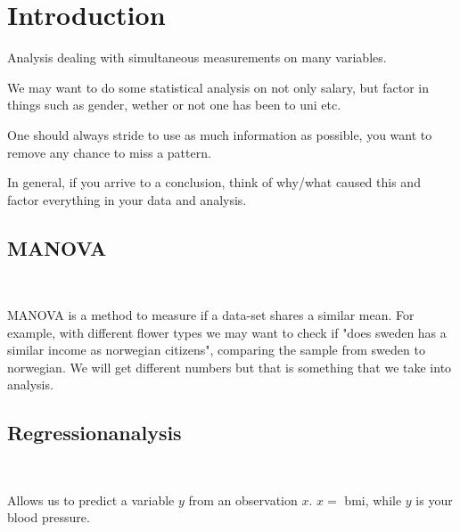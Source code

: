 \section{Introduction}
\par\bigskip
\noindent Analysis dealing with simultaneous measurements on many variables. 
\par\bigskip
\noindent We may want to do some statistical analysis on not only salary, but factor in things such as gender, wether or not one has been to uni etc.
\par\bigskip
\noindent One should always stride to use as much information as possible, you want to remove any chance to miss a pattern.
\par\bigskip
\noindent In general, if you arrive to a conclusion, think of why/what caused this and factor everything in your data and analysis. 
\par\bigskip
\subsection{MANOVA}\hfill\\\par
\noindent MANOVA is a method to measure if a data-set shares a similar mean. For example, with different flower types we may want to check if "does sweden has a similar income as norwegian citizens", comparing the sample from sweden to norwegian. We will get different numbers but that is something that we take into analysis.
\par\bigskip
\subsection{Regressionanalysis}\hfill\\\par
\noindent Allows us to predict a variable $y$ from an observation $x$. $x= $ bmi, while $y$ is your blood pressure. 
